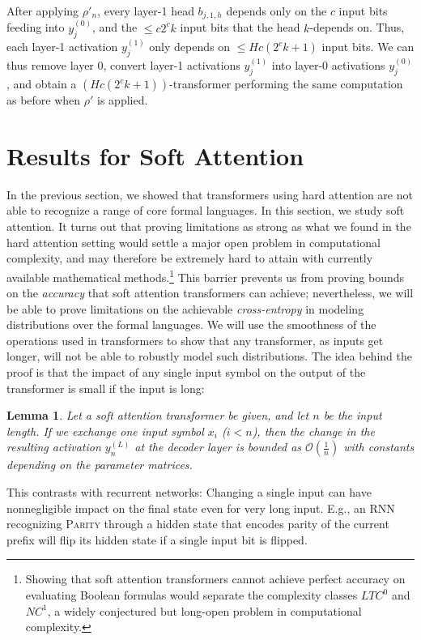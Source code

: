 \documentclass[11pt,a4paper]{article}
\newcounter{theorem}
\newtheorem{lemma}[theorem]{Lemma}
\begin{document}
After applying $\rho'_n$, every layer-1 head $b_{j,1,h}$ depends only on the $c$ input bits feeding into $y_j^{(0)}$, and the $\leq c2^ck$ input bits that the head $k$-depends on.
Thus, each layer-1 activation $y_j^{(1)}$ only depends on $\leq Hc(2^ck+1)$ input bits.
We can thus remove layer 0, convert layer-1 activations $y_j^{(1)}$ into layer-0 activations $y_j^{(0)}$, and obtain a $(Hc(2^ck+1))$-transformer performing the same computation as before when $\rho'$ is applied.





\section{Results for Soft Attention}\label{sec:soft}

In the previous section, we showed that transformers using hard attention are not able to recognize a range of core formal languages.
In this section, we study soft attention.
It turns out that proving limitations as strong as what we found in the hard attention setting would settle a major open problem in computational complexity, and  may therefore be extremely hard to attain with currently available mathematical methods.\footnote{Showing that soft attention transformers cannot achieve perfect accuracy on evaluating Boolean formulas would separate the complexity classes $LTC^0$ and $NC^1$, a widely conjectured but long-open problem in computational complexity.}
This barrier prevents us from proving bounds on the \emph{accuracy} that soft attention transformers can achieve; nevertheless, we will be able to prove limitations on the achievable \emph{cross-entropy} in modeling distributions over the formal languages.
We will use the smoothness of the operations used in transformers to show that any transformer, as inputs get longer, will not be able to robustly model such distributions.
The idea behind the proof is that the impact of any single input symbol on the output of the transformer is small if the input is long:
\begin{lemma}\label{lem:soft-tech}
Let a soft attention transformer be given, and let $n$ be the input length.
If we exchange one input symbol $x_i$ ($i < n$), %
then the change in the resulting activation $y_n^{(L)}$ at the decoder layer is bounded as $\mathcal{O}(\frac{1}{n})$ with constants depending on the parameter matrices.
\end{lemma}
This contrasts with recurrent networks:
Changing a single input can have nonnegligible impact on the final state even for very long input.
E.g., an RNN recognizing \textsc{Parity} through a hidden state that encodes parity of the current prefix will flip its hidden state if a single input bit is flipped.
\end{document}
